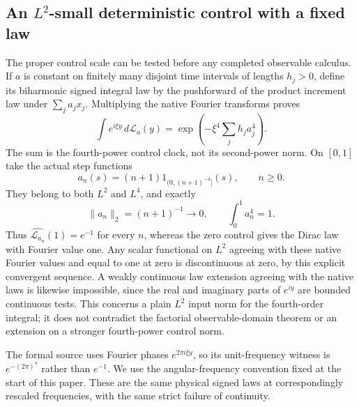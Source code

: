 \documentclass[11pt]{article}
\theoremstyle{remark}\newtheorem{remark}[theorem]{Remark}
\begin{document}
\subsection{An $L^2$-small deterministic control with a fixed law}\label{sec:fixed-law-control}
The proper control scale can be tested before any completed observable
calculus. If $a$ is constant on finitely many disjoint time intervals
of lengths $h_j>0$, define its biharmonic signed integral law by the
pushforward of the product increment law under $\sum_j a_jx_j$.
Multiplying the native Fourier transforms proves
\[
 \int e^{i\xi y}\,d\mathcal L_a(y)
   =\exp\left(-\xi^4\sum_jh_ja_j^4\right).
\]
The sum is the fourth-power control clock, not its second-power norm.
On $[0,1]$ take the actual step functions
\[
 a_n(s)=(n+1)1_{(0,(n+1)^{-4}]}(s),\qquad n\geq0.
\]
They belong to both $L^2$ and $L^4$, and exactly
\[
 \|a_n\|_2=(n+1)^{-1}\longrightarrow0,\qquad
 \int_0^1 a_n^4=1.
\]
Thus $\widehat{\mathcal L_{a_n}}(1)=e^{-1}$ for every $n$, whereas
the zero control gives the Dirac law with Fourier value one.
Any scalar functional on $L^2$ agreeing with these native Fourier
values and equal to one at zero is discontinuous at zero, by this
explicit convergent sequence. A weakly continuous law extension
agreeing with the native laws is likewise impossible, since the
real and imaginary parts of $e^{iy}$ are bounded continuous tests.
This concerns a plain $L^2$ input norm for the fourth-order integral;
it does not contradict the factorial observable-domain theorem or
an extension on a stronger fourth-power control norm.

The formal source uses Fourier phases $e^{2\pi i\xi y}$, so its
unit-frequency witness is $e^{-(2\pi)^4}$ rather than $e^{-1}$.
We use the angular-frequency convention fixed at the start of this
paper. These are the same physical signed laws at correspondingly
rescaled frequencies, with the same strict failure of continuity.
\end{document}
